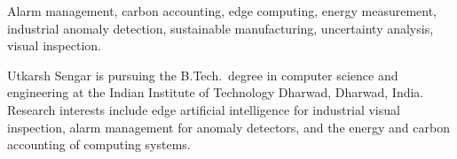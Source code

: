 \documentclass{ieeeaccess}
\begin{document}
\begin{keywords}
Alarm management, carbon accounting, edge computing, energy measurement, industrial anomaly detection, sustainable manufacturing, uncertainty analysis, visual inspection.
\end{keywords}

\titlepgskip=-21pt

\maketitle








\begin{IEEEbiographynophoto}{Utkarsh Sengar}
is pursuing the B.Tech.\ degree in computer science and engineering at the Indian Institute of Technology Dharwad, Dharwad, India. Research interests include edge artificial intelligence for industrial visual inspection, alarm management for anomaly detectors, and the energy and carbon accounting of computing systems.
\end{IEEEbiographynophoto}

\EOD
\end{document}
